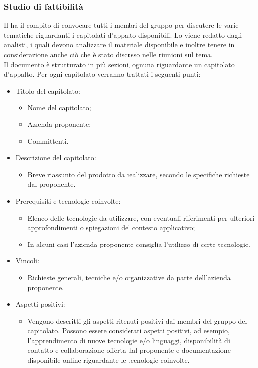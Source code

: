 \subsubsection{Studio di fattibilità}
Il \Responsabile{} ha il compito di convocare tutti i membri del gruppo \Gruppo{} per discutere le varie tematiche riguardanti i capitolati d'appalto disponibili.
Lo \SdF{} viene redatto dagli analisti, i quali devono analizzare il materiale disponibile e inoltre tenere in considerazione anche ciò che è stato discusso nelle riunioni sul tema.\\
Il documento è strutturato in più sezioni, ognuna riguardante un capitolato d'appalto.
Per ogni capitolato verranno trattati i seguenti punti:
\begin{itemize}
\item Titolo del capitolato:
	\begin{itemize}
	\item Nome del capitolato;
	\item Azienda proponente;
	\item Committenti.
	\end{itemize}
\item Descrizione del capitolato:
	\begin{itemize}
	\item Breve riassunto del prodotto da realizzare, secondo le specifiche richieste dal proponente.
	\end{itemize}
\item Prerequisiti e tecnologie coinvolte:
	\begin{itemize}
	\item Elenco delle tecnologie da utilizzare, con eventuali riferimenti per ulteriori approfondimenti o spiegazioni del contesto applicativo;
	\item In alcuni casi l'azienda proponente consiglia l'utilizzo di certe tecnologie.
	\end{itemize}
\item Vincoli:
	\begin{itemize}
	\item Richieste generali, tecniche e/o organizzative da parte dell'azienda proponente.
	\end{itemize}
\item Aspetti positivi:
	\begin{itemize}
	\item Vengono descritti gli aspetti ritenuti positivi dai membri del gruppo \Gruppo{} del capitolato.
	Possono essere considerati aspetti positivi, ad esempio, l'apprendimento di nuove tecnologie e/o linguaggi, disponibilità di contatto e collaborazione offerta dal proponente e documentazione disponibile online riguardante le tecnologie coinvolte.

\end{itemize}
\end{itemize}
